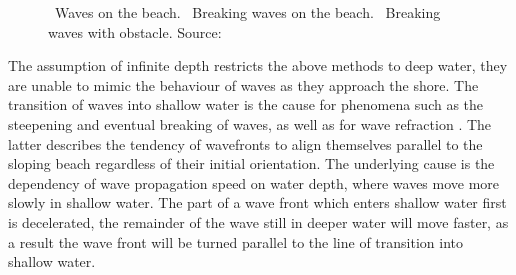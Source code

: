 \begin{figure}[t]
{	\label{fig:peachey1986:2}
 }
 \hfill
 \caption[Waves on the beach by \citet{Peachey:1986}.]{
~Waves on the beach.
~Breaking waves on the beach.
~Breaking waves with obstacle.
Source:~\citet{Peachey:1986}}
\label{fig:peachey1986}
\end{figure}
%

The assumption of infinite depth restricts the above methods to deep water,
they are unable to mimic the behaviour of waves as they approach the shore.
The transition of waves into shallow water is the cause for phenomena such
as the steepening and eventual breaking of waves, as well as for wave
refraction \citep{book:mei1989}. The latter describes the tendency of wavefronts
to align themselves
parallel to the sloping beach regardless of their initial orientation.
The underlying cause is the dependency of wave propagation speed on water depth,
where waves move more slowly in shallow water. The part of a wave front which
enters shallow water first is decelerated, the remainder of the wave still
in deeper water will move faster, as a result the wave front will be turned
parallel to the line of transition into shallow water.

